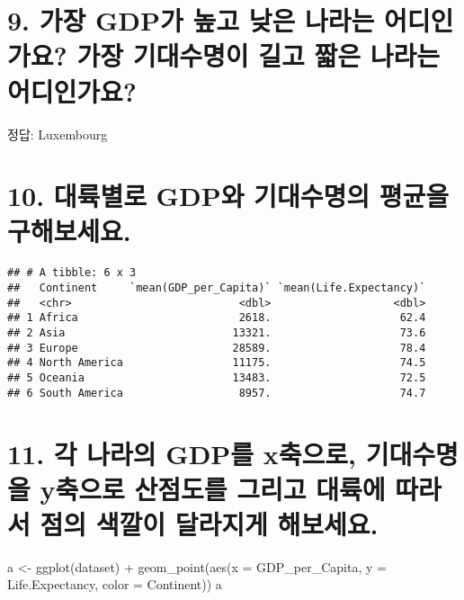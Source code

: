 \documentclass[a4paper]{article}
\newenvironment{Shaded}{}{}
\newcommand{\KeywordTok}[1]{\textcolor[rgb]{0.00,0.00,1.00}{#1}}
\newcommand{\DataTypeTok}[1]{#1}
\newcommand{\StringTok}[1]{\textcolor[rgb]{0.00,0.50,0.50}{#1}}
\newcommand{\OperatorTok}[1]{#1}
\newcommand{\NormalTok}[1]{#1}
\begin{document}
\section{9. 가장 GDP가 높고 낮은 나라는 어디인가요? 가장 기대수명이 길고
짧은 나라는 어디인가요?}\label{-gdp----------}

정답: Luxembourg

\section{10. 대륙별로 GDP와 기대수명의 평균을
구해보세요.}\label{-gdp---.}

\begin{Shaded}
\end{Shaded}

\begin{verbatim}
## # A tibble: 6 x 3
##   Continent     `mean(GDP_per_Capita)` `mean(Life.Expectancy)`
##   <chr>                          <dbl>                   <dbl>
## 1 Africa                         2618.                    62.4
## 2 Asia                          13321.                    73.6
## 3 Europe                        28589.                    78.4
## 4 North America                 11175.                    74.5
## 5 Oceania                       13483.                    72.5
## 6 South America                  8957.                    74.7
\end{verbatim}

\section{11. 각 나라의 GDP를 x축으로, 기대수명을 y축으로 산점도를 그리고
대륙에 따라서 점의 색깔이 달라지게 해보세요.}\label{--gdp-x--y--------.}

\begin{Shaded}
\begin{Highlighting}[]
\NormalTok{a <-}\StringTok{ }\KeywordTok{ggplot}\NormalTok{(dataset) }\OperatorTok{+}\StringTok{ }
\StringTok{  }\KeywordTok{geom_point}\NormalTok{(}\KeywordTok{aes}\NormalTok{(}\DataTypeTok{x =}\NormalTok{ GDP_per_Capita, }\DataTypeTok{y =}\NormalTok{ Life.Expectancy, }\DataTypeTok{color =}\NormalTok{ Continent))}
\NormalTok{a}
\end{Highlighting}
\end{Shaded}
\end{document}
